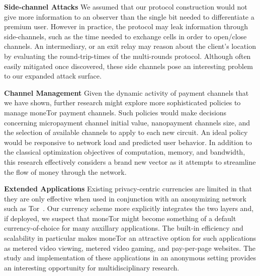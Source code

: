 \textbf{Side-channel Attacks} We assumed that our protocol construction would
not give more information to an observer than the single bit needed to
differentiate a premium user. However in practice, the protocol may leak
information through side-channels, such as the time needed to exchange cells in
order to open/close channels. An intermediary, or an exit relay may reason about
the client's location by evaluating the round-trip-times of the multi-rounds
protocol. Although often easily mitigated once discovered, these side channels
pose an interesting problem to our expanded attack surface.

\textbf{Channel Management} Given the dynamic activity of payment channels that
we have shown, further research might explore more sophisticated policies to
manage moneTor payment channels. Such policies would make decisions concerning
micropayment channel initial value, nanopayment channels size, and the selection
of available channels to apply to each new circuit. An ideal policy would be
responsive to network load and predicted user behavior. In addition to the
classical optimization objectives of computation, memory, and bandwidth, this
research effectively considers a brand new vector as it attempts to streamline
the flow of money through the network.

\textbf{Extended Applications} Existing privacy-centric currencies are limited
in that they are only effective when used in conjunction with an anonymizing
network such as Tor~\cite{sasson2014zerocash}. Our currency scheme more
explicitly integrates the two layers and, if deployed, we suspect that moneTor
might become something of a default currency-of-choice for many auxillary
applications. The built-in efficiency and scalability in particular makes
moneTor an attractive option for such applications as metered video viewing,
metered video gaming, and pay-per-page websites. The study and implementation of
these applications in an anonymous setting provides an interesting opportunity
for multidisciplinary research.